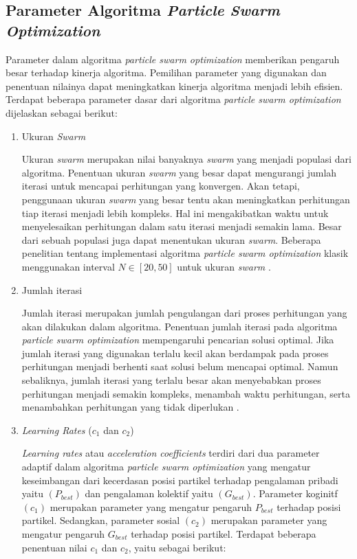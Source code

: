 {\subsection{Parameter Algoritma \textit{Particle Swarm Optimization}}
{\frenchspacing
    Parameter dalam algoritma \textit{particle swarm optimization} memberikan pengaruh besar terhadap kinerja algoritma.
    Pemilihan parameter yang digunakan dan penentuan nilainya dapat meningkatkan kinerja algoritma menjadi lebih efisien.
    Terdapat beberapa parameter dasar dari algoritma \textit{particle swarm optimization} dijelaskan sebagai berikut:
    \begin{enumerate}[align=left, left=0em, nolistsep]
        \item Ukuran \textit{Swarm} \par \nobreak
              Ukuran \textit{swarm} merupakan nilai banyaknya \textit{swarm} yang menjadi populasi dari algoritma.
              Penentuan ukuran \textit{swarm} yang besar dapat mengurangi jumlah iterasi untuk mencapai perhitungan yang konvergen.
              Akan tetapi, penggunaan ukuran \textit{swarm} yang besar tentu akan meningkatkan perhitungan tiap iterasi menjadi lebih kompleks.
              Hal ini mengakibatkan waktu untuk menyelesaikan perhitungan dalam satu iterasi menjadi semakin lama.
              Besar dari sebuah populasi juga dapat menentukan ukuran \textit{swarm}.
              Beberapa penelitian tentang implementasi algoritma \textit{particle swarm optimization} klasik menggunakan
              interval $N \in [20,50]$ untuk ukuran \textit{swarm} .
        \item Jumlah iterasi \par \nobreak
              Jumlah iterasi merupakan jumlah pengulangan dari proses perhitungan yang akan dilakukan dalam algoritma.
              Penentuan jumlah iterasi pada algoritma \textit{particle swarm optimization} mempengaruhi pencarian solusi optimal.
              Jika jumlah iterasi yang digunakan terlalu kecil akan berdampak pada proses perhitungan menjadi berhenti saat solusi belum mencapai optimal.
              Namun sebaliknya, jumlah iterasi yang terlalu besar akan menyebabkan proses perhitungan menjadi semakin kompleks, menambah waktu perhitungan, serta
              menambahkan perhitungan yang tidak diperlukan .
        \item \textit{Learning Rates} ($c_{1}$ dan $c_{2}$) \par \nobreak
              \textit{Learning rates} atau \textit{acceleration coefficients} terdiri dari dua parameter adaptif dalam algoritma \textit{particle swarm optimization} yang mengatur keseimbangan dari kecerdasan posisi partikel
              terhadap pengalaman pribadi yaitu $(P_{best})$ dan pengalaman kolektif yaitu $(G_{best})$.
              Parameter koginitf $(c_{1})$ merupakan parameter yang mengatur pengaruh $P_{best}$ terhadap posisi partikel.
              Sedangkan, parameter sosial $(c_{2})$ merupakan parameter yang mengatur pengaruh $G_{best}$ terhadap posisi partikel.
              Terdapat beberapa penentuan nilai $c_{1}$ dan $c_{2}$, yaitu sebagai berikut:


\end{enumerate}}}
